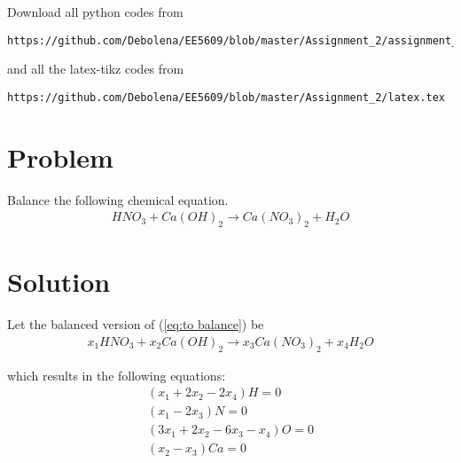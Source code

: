 \documentclass[journal,12pt,twocolumn]{IEEEtran}
\begin{document}
Download all python codes from 

\begin{lstlisting}
https://github.com/Debolena/EE5609/blob/master/Assignment_2/assignment_2.py
\end{lstlisting}
%
and all the latex-tikz codes from 
%
\begin{lstlisting}
https://github.com/Debolena/EE5609/blob/master/Assignment_2/latex.tex
\end{lstlisting}
%
\section{Problem}
    Balance the following chemical equation.
    \begin{align}
        \label{eq:to balance} HNO_{3}+ Ca(OH)_{2}\to Ca(NO_{3})_{2}+H_{2}O
    \end{align}
%

%
%
\section{Solution}
Let the balanced version of (\ref{eq:to balance}) be
\begin{align}
    \label{eq:balanced}x_{1}HNO_{3}+ x_{2}Ca(OH)_{2}\to x_{3}Ca(NO_{3})_{2}+ x_{4}H_{2}O
\end{align}

which results in the following equations:
\begin{align}
    (x_{1}+ 2x_{2}-2x_{4}) H= 0\\
    (x_{1}-2x_{3}) N= 0\\
    (3x_{1}+ 2x_{2}-6x_{3}- x_{4}) O=0\\
    (x_{2}-x_{3}) Ca= 0
\end{align}
\end{document}
